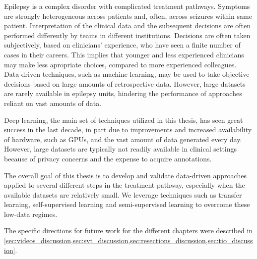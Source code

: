 
Epilepsy is a complex disorder with complicated treatment pathways.
Symptoms are strongly heterogeneous across patients and, often, across seizures within same patient.
Interpretation of the clinical data and the subsequent decisions are often performed differently by teams in different institutions.
Decisions are often taken subjectively, based on clinicians' experience, who have seen a finite number of cases in their careers.
This implies that younger and less experienced clinicians may make less apropriate choices, compared to more experienced colleagues.
Data-driven techniques, such as machine learning, may be used to take objective decisions based on large amounts of retrospective data.
However, large datasets are rarely available in epilepsy units, hindering the performance of approaches reliant on vast amounts of data.

Deep learning, the main set of techniques utilized in this thesis, has seen great success in the last decade, in part due to improvements and increased availability of hardware, such as \acp{GPU}, and the vast amount of data generated every day.
However, large datasets are typically not readily available in clinical settings because of privacy concerns and the expense to acquire annotations.

The overall goal of this thesis is to develop and validate data-driven approaches applied to several different steps in the treatment pathway, especially when the available datasets are relatively small.
We leverage techniques such as transfer learning, self-supervised learning and semi-supervised learning to overcome these low-data regimes.


The specific directions for future work for the different chapters were described in \cref{sec:videos_discussion,sec:svt_discussion,sec:resections_discussion,sec:tio_discussion}.

